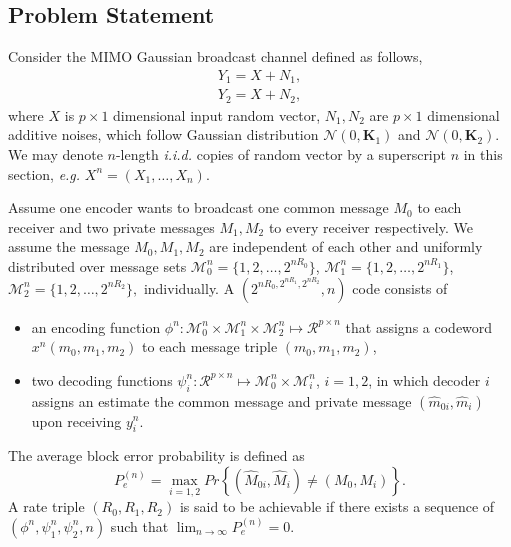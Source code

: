 \documentclass[journal,final, onecolumn]{IEEEtran}
\begin{document}
\subsection{Problem Statement}
Consider the MIMO Gaussian broadcast channel defined as follows,
\begin{align}
Y_{1} = X + N_{1}, \\
Y_{2} =X + N_{2},
\end{align}
where ${X}$ is $p \times 1 $ dimensional input random vector, ${N}_{1}, {N}_{2}$ are $ p \times 1 $ dimensional additive noises, which follow Gaussian distribution $\mathcal{N}(0, \boldsymbol{K}_{1})$ and $\mathcal{N}(0, \boldsymbol{K}_{2})$. We may denote $n$-length \emph{i.i.d.} copies of random vector by a superscript $n$ in this section, \emph{e.g.} ${X}^{n} = \left( {X}_{1}, \ldots, {X}_{n}\right)$.\par

Assume one encoder wants to broadcast one common message $M_{0}$ to each receiver and two private messages  $M_{1}, M_{2}$ to every receiver respectively. We assume the message $ M_{0}, M_{1}, M_{2} $ are independent of each other and uniformly distributed over message sets $\mathcal{M}_{0}^{n} = \{ 1,2, \ldots, 2^{nR_{0}}\}$, $\mathcal{M}_{1}^{n} = \{ 1,2, \ldots, 2^{nR_{1}}\}$, $\mathcal{M}_{2}^{n} = \{ 1,2, \ldots, 2^{nR_{2}}\},$ individually.
A $(2^{nR_{0},2^{nR_{1}}, 2^{nR_{2}}},n)$ code consists of
\begin{itemize}
  \item an encoding function $\mathcal{\phi}^{n}: \mathcal{M}_{0}^{n} \times \mathcal{M}_{1}^{n} \times \mathcal{M}_{2}^{n} \mapsto \mathcal{R}^{p \times n}$ that assigns a codeword $x^{n}(m_{0},m_{1}, m_{2})$ to each message triple $(m_0, m_1,m_2)$,
  \item two decoding functions $\mathcal{\psi}_{i}^{n}: \mathcal{R}^{p \times n} \mapsto \mathcal{M}_{0}^{n} \times \mathcal{M}_{i}^{n}$, $i=1,2$, in which decoder $i$ assigns an estimate the common message and private message $(\hat{m}_{0i}, \hat{m}_{i})$ upon receiving $y^{n}_i$.
\end{itemize}
The average block error probability is defined as
\begin{equation}
P_{e}^{(n)} =  \max_{i= 1,2 }Pr \left\{  (\hat{M}_{0i}, \hat{M}_{i}) \neq  (M_{0}, M_{i}) \right\}.
\end{equation}
A rate triple $(R_{0}, R_{1}, R_{2})$ is said to be achievable if there exists a sequence of $( \mathcal{\phi}^{n}, \mathcal{\psi}^{n}_{1}, \mathcal{\psi}^{n}_{2}, n )$ such that $\lim_{n \rightarrow \infty} P_{e}^{(n)}= 0$.
\par
\end{document}
